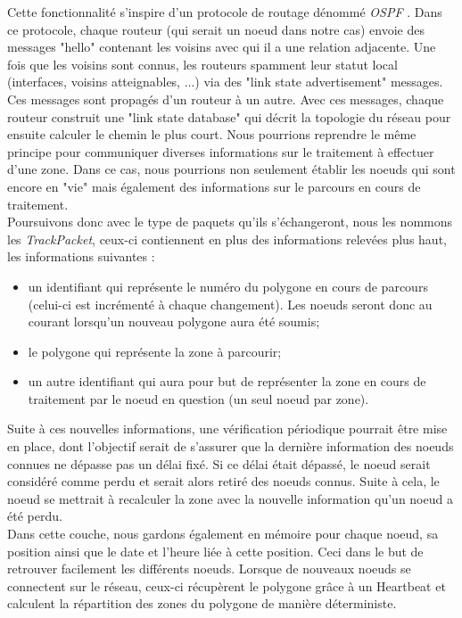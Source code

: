 \documentclass[journal, a4paper]{IEEEtran}
\begin{document}
        Cette fonctionnalité s'inspire d'un protocole de routage dénommé \textit{OSPF} \cite{kurose2017computer}. Dans ce protocole, chaque routeur (qui serait un noeud dans notre cas) 
        envoie des messages "hello" contenant les voisins avec qui il a une relation adjacente. 
        Une fois que les voisins sont connus, les routeurs spamment leur statut local (interfaces, voisins atteignables, ...) via des "link state advertisement" messages. Ces messages sont propagés 
        d'un routeur à un autre. Avec ces messages, chaque routeur construit une "link state database" qui décrit la topologie du réseau pour ensuite calculer le chemin le plus court. Nous pourrions 
        reprendre le même principe pour communiquer diverses informations sur le traitement à effectuer d'une zone. Dans ce cas, nous pourrions non seulement établir les 
        noeuds qui sont encore en "vie" mais également des informations sur le parcours en cours de traitement. \\

        Poursuivons donc avec le type de paquets qu'ils s'échangeront, nous les nommons les \textit{TrackPacket}, ceux-ci contiennent en plus des informations relevées plus haut, 
        les informations suivantes :
        \begin{itemize}
                \item un identifiant qui représente le numéro du polygone en cours de parcours (celui-ci est incrémenté à chaque changement). Les noeuds seront donc au courant lorsqu'un nouveau 
                polygone aura été soumis;
                \item le polygone qui représente la zone à parcourir;
                \item un autre identifiant qui aura pour but de représenter la zone en cours de traitement par le noeud en question (un seul noeud par zone). \\
        \end{itemize}

        Suite à ces nouvelles informations, une vérification périodique pourrait être mise en place, dont l'objectif serait de s'assurer que la dernière information des noeuds connues ne dépasse pas un 
        délai fixé. Si ce délai était dépassé, le noeud serait considéré comme perdu et serait alors retiré des noeuds connus. Suite à cela, le noeud se mettrait à recalculer la zone avec la 
        nouvelle information qu'un noeud a été perdu. \\

        Dans cette couche, nous gardons également en mémoire pour chaque noeud, sa position ainsi que le date et l'heure liée à cette position. Ceci dans le but de 
        retrouver facilement les différents noeuds. Lorsque de nouveaux noeuds se connectent sur le réseau, ceux-ci récupèrent le polygone grâce à un Heartbeat et calculent la répartition des 
        zones du polygone de manière déterministe.
\end{document}
